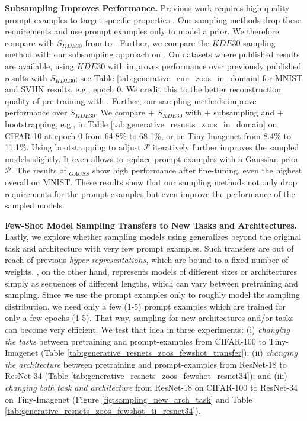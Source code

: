 \textbf{Subsampling Improves Performance.}
Previous work requires high-quality prompt examples to target specific properties \citep{schurholtHyperRepresentationsGenerativeModels2022}. Our sampling methods drop these requirements and use prompt examples only to model a prior. We therefore compare \ourmethod with $S_{KDE30}$ from \citep{schurholtHyperRepresentationsGenerativeModels2022} to \ourmethod. Further, we compare the $KDE30$ sampling method with our subsampling approach on \ourmethod. 
On datasets where published results are available, using $KDE30$ with \ourmethod improves performance over previously published results with $S_{KDE30}$; see Table \ref{tab:generative_cnn_zoos_in_domain} for MNIST and SVHN results, e.g., epoch 0. We credit this to the better reconstruction quality of pre-training with \ourmethod.
Further, our sampling methods improve performance over $S_{KDE30}$. We compare \ourmethod + $S_{KDE30}$ with \ourmethod + subsampling and \ourmethod + bootstrapping, e.g., in Table \ref{tab:generative_resnets_zoos_in_domain} on CIFAR-10 at epoch 0 from 64.8\% to 68.1\%, or on Tiny Imagenet from 8.4\% to 11.1\%. 
Using bootstrapping to adjust $\mathcal{P}$ iteratively further improves the sampled models slightly. It even allows to replace prompt examples with a Gaussian prior $\mathcal{P}$. The results of \ourmethod$_{GAUSS}$ show high performance after fine-tuning, even the highest overall on MNIST. 
These results show that our sampling methods not only drop requirements for the prompt examples but even improve the performance of the sampled models.



\textbf{Few-Shot Model Sampling Transfers to New Tasks and Architectures.}
Lastly, we explore whether sampling models using \ourmethod generalizes beyond the original task and architecture with very few prompt examples. 
Such transfers are out of reach of previous \textit{hyper-representations}, which are bound to a fixed number of weights.
\ourmethod, on the other hand, represents models of different sizes or architectures simply as sequences of different lengths, which can vary between pretraining and sampling. 
Since we use the prompt examples only to roughly model the sampling distribution, we need only a few (1-5) prompt examples which are trained for only a few epochs (1-5). 
That way, sampling for new architectures and/or tasks can become very efficient.
We test that idea in three experiments: 
(i) \emph{changing the tasks} between pretraining and prompt-examples from CIFAR-100 to Tiny-Imagenet (Table \ref{tab:generative_resnets_zoos_fewshot_transfer}); 
(ii) \emph{changing the architecture} between pretraining and prompt-examples from ResNet-18 to ResNet-34 (Table \ref{tab:generative_resnets_zoos_fewshot_resnet34}); and 
(iii) \emph{changing both task and architecture} from ResNet-18 on CIFAR-100 to ResNet-34 on Tiny-Imagenet (Figure \ref{fig:sampling_new_arch_task} and Table \ref{tab:generative_resnets_zoos_fewshot_ti_resnet34}).



